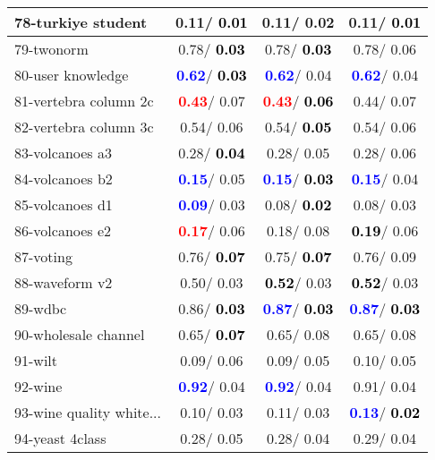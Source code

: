\begin{table}[h]
\begin{center}
\begin{tabular}{lc|c|c}
78-turkiye student &   0.11/\textcolor{black}{\textbf{  0.01}} &   0.11/  0.02 &   0.11/\textcolor{black}{\textbf{  0.01}} \\ \hline
79-twonorm &   0.78/\textcolor{black}{\textbf{  0.03}} &   0.78/\textcolor{black}{\textbf{  0.03}} &   0.78/  0.06 \\
80-user knowledge & \textcolor{blue}{\textbf{  0.62}}/\textcolor{black}{\textbf{  0.03}} & \textcolor{blue}{\textbf{  0.62}}/  0.04 & \textcolor{blue}{\textbf{  0.62}}/  0.04 \\
81-vertebra column 2c & \textcolor{red}{\textbf{  0.43}}/  0.07 & \textcolor{red}{\textbf{  0.43}}/\textcolor{black}{\textbf{  0.06}} &   0.44/  0.07 \\
82-vertebra column 3c &   0.54/  0.06 &   0.54/\textcolor{black}{\textbf{  0.05}} &   0.54/  0.06 \\
83-volcanoes a3 &   0.28/\textcolor{black}{\textbf{  0.04}} &   0.28/  0.05 &   0.28/  0.06 \\
84-volcanoes b2 & \textcolor{blue}{\textbf{  0.15}}/  0.05 & \textcolor{blue}{\textbf{  0.15}}/\textcolor{black}{\textbf{  0.03}} & \textcolor{blue}{\textbf{  0.15}}/  0.04 \\
85-volcanoes d1 & \textcolor{blue}{\textbf{  0.09}}/  0.03 &   0.08/\textcolor{black}{\textbf{  0.02}} &   0.08/  0.03 \\ \hline
86-volcanoes e2 & \textcolor{red}{\textbf{  0.17}}/  0.06 &   0.18/  0.08 & \textcolor{black}{\textbf{  0.19}}/  0.06 \\
87-voting &   0.76/\textcolor{black}{\textbf{  0.07}} &   0.75/\textcolor{black}{\textbf{  0.07}} &   0.76/  0.09 \\
88-waveform v2 &   0.50/  0.03 & \textcolor{black}{\textbf{  0.52}}/  0.03 & \textcolor{black}{\textbf{  0.52}}/  0.03 \\
89-wdbc &   0.86/\textcolor{black}{\textbf{  0.03}} & \textcolor{blue}{\textbf{  0.87}}/\textcolor{black}{\textbf{  0.03}} & \textcolor{blue}{\textbf{  0.87}}/\textcolor{black}{\textbf{  0.03}} \\
90-wholesale channel &   0.65/\textcolor{black}{\textbf{  0.07}} &   0.65/  0.08 &   0.65/  0.08 \\
91-wilt &   0.09/  0.06 &   0.09/  0.05 &   0.10/  0.05 \\
92-wine & \textcolor{blue}{\textbf{  0.92}}/  0.04 & \textcolor{blue}{\textbf{  0.92}}/  0.04 &   0.91/  0.04 \\ \hline
93-wine quality white... &   0.10/  0.03 &   0.11/  0.03 & \textcolor{blue}{\textbf{  0.13}}/\textcolor{black}{\textbf{  0.02}} \\
94-yeast 4class &   0.28/  0.05 &   0.28/  0.04 &   0.29/  0.04 \\\end{tabular}\label{stratsALCKappa2b5NNRedux}
\end{center}
\end{table}